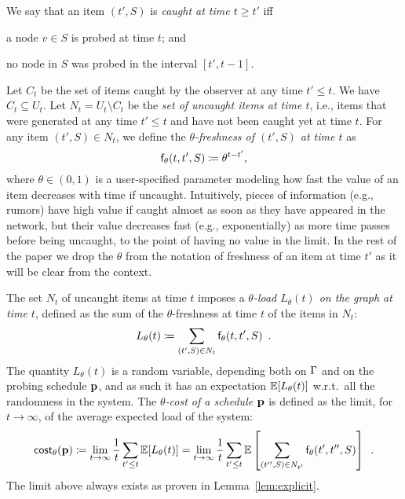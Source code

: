 We say that an item $(t',S)$ is \emph{caught at time $t\ge t'$} iff
\begin{enumerate*}
	\item a node $v\in S$ is probed at time $t$; and
	\item no node in $S$ was probed in the interval $[t',t-1]$.
\end{enumerate*}

Let $C_t$ be the set of items caught by the observer at any time $t'\le t$. We
have $C_t\subseteq U_t$. Let $N_t= U_t\setminus C_t$ be the \emph{set of
uncaught items at time $t$}, i.e., items that were generated at any time
$t'\le t$ and have not been caught yet at time $t$. For any item $(t',S)\in
N_t$, we define the \emph{$\theta$-freshness of $(t',S)$ at time $t$} as
\[
	\mathsf{f}_\theta(t,t',S)\coloneqq\theta^{t-t'},
\]
where $\theta\in(0,1)$ is a user-specified parameter modeling how fast the
value of an item decreases with time if uncaught. Intuitively, pieces of
information (e.g., rumors) have high value if caught almost as soon as they have
appeared in the network, but their value decreases fast (e.g., exponentially) as
more time passes before being uncaught, to the point of having no value in the
limit. In the rest of the paper we drop the $\theta$ from the notation of
freshness of an item at time $t'$ as it will be clear from the context.

 The set $N_t$ of uncaught items
at time $t$ imposes a \emph{$\theta$-load $L_\theta(t)$ on the graph at time
$t$}, defined as the sum of the $\theta$-freshness at time $t$ of the items in
$N_t$:
\[
	L_\theta(t)\coloneqq\sum_{(t',S)\in N_t} \mathsf{f}_\theta(t,t',S)\enspace.
\]
The quantity $L_\theta(t)$ is a random variable, depending both on $\Gamma$ and on
the probing schedule $\mathbf{p}$, and as such it has an expectation
$\mathbb{E}[L_\theta(t)]$ w.r.t.~all the randomness in the system. The
\emph{$\theta$-cost of a schedule $\mathbf{p}$} is defined as the limit, for
$t\rightarrow\infty$, of the average expected load of the system:
\[
	\mathsf{cost}_\theta(\mathbf{p})\coloneqq\lim_{t\rightarrow\infty}\frac{1}{t}\sum_{t'\le
	t}\mathbb{E}[L_\theta(t)]=\lim_{t\rightarrow\infty}\frac{1}{t}\sum_{t'\le
	t}\mathbb{E}\left[\sum_{(t'',S)\in N_{t'}}\mathsf{f}_\theta(t',t'',S)\right]\enspace.
\]
The limit above always exists as proven in Lemma~\ref{lem:explicit}.

